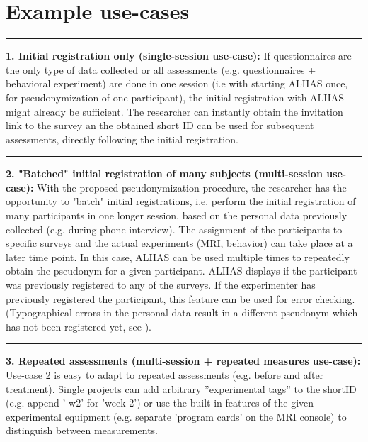 \section{Example use-cases}
\label{use-case:one-session}
\par\noindent\rule{\textwidth\color{pniblue}}{0.4pt}
\textbf{1. Initial registration only (single-session use-case):}
If questionnaires are the only type of data collected or all assessments (e.g. questionnaires + behavioral experiment) are done in one session (i.e with starting ALIIAS once, for pseudonymization of one participant), the initial registration with ALIIAS might already be sufficient. The researcher can instantly obtain the invitation link to the survey an the obtained short ID can be used for subsequent assessments, directly following the initial registration.

\par\noindent\rule{\textwidth\color{pniblue}}{0.4pt}
\textbf{2. "Batched" initial registration of many subjects (multi-session use-case):}
With the proposed pseudonymization procedure, the researcher has the opportunity to "batch" initial registrations, i.e. perform the initial registration of many participants in one longer session, based on the personal data previously collected (e.g. during phone interview). The assignment of the participants to specific surveys and the actual experiments (MRI, behavior) can take place at a later time point. In this case, ALIIAS can be used multiple times to repeatedly obtain the pseudonym for a given participant. ALIIAS displays if the participant was previously registered to any of the surveys. If the experimenter has previously registered the participant, this feature can be used for error checking. (Typographical errors in the personal data result in a different pseudonym which has not been registered yet, see ).

\par\noindent\rule{\textwidth\color{pniblue}}{0.4pt}
\textbf{3. Repeated assessments (multi-session + repeated measures use-case):}
Use-case 2 is easy to adapt to repeated assessments (e.g. before and after treatment). Single projects can add arbitrary ”experimental tags” to the shortID (e.g. append ’-w2’ for 'week 2') or use the built in features of the given experimental equipment (e.g. separate ’program cards’ on the MRI console) to distinguish between measurements. 

